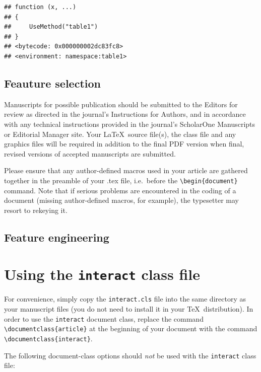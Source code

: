 \documentclass[]{interact}
\theoremstyle{plain}%
\theoremstyle{definition}
\theoremstyle{remark}
\begin{document}
\begin{verbatim}
## function (x, ...) 
## {
##     UseMethod("table1")
## }
## <bytecode: 0x000000002dc83fc8>
## <environment: namespace:table1>
\end{verbatim}

\hypertarget{feauture-selection}{%
\subsection{Feauture selection}\label{feauture-selection}}

Manuscripts for possible publication should be submitted to the Editors
for review as directed in the journal's Instructions for Authors, and in
accordance with any technical instructions provided in the journal's
ScholarOne Manuscripts or Editorial Manager site. Your \LaTeX~source
file(s), the class file and any graphics files will be required in
addition to the final PDF version when final, revised versions of
accepted manuscripts are submitted.

Please ensure that any author-defined macros used in your article are
gathered together in the preamble of your .tex file, i.e.~before the
\texttt{\textbackslash{}begin\{document\}} command. Note that if serious
problems are encountered in the coding of a document (missing
author-defined macros, for example), the typesetter may resort to
rekeying it.

\hypertarget{feature-engineering}{%
\subsection{Feature engineering}\label{feature-engineering}}

\hypertarget{using-the-interact-class-file}{%
\section{\texorpdfstring{Using the \texttt{interact} class
file}{Using the interact class file}}\label{using-the-interact-class-file}}

For convenience, simply copy the \texttt{interact.cls} file into the
same directory as your manuscript files (you do not need to install it
in your \TeX~distribution). In order to use the \texttt{interact}
document class, replace the command
\texttt{\textbackslash{}documentclass\{article\}} at the beginning of
your document with the command
\texttt{\textbackslash{}documentclass\{interact\}}.

The following document-class options should \emph{not} be used with the
\texttt{interact} class file:
\end{document}
